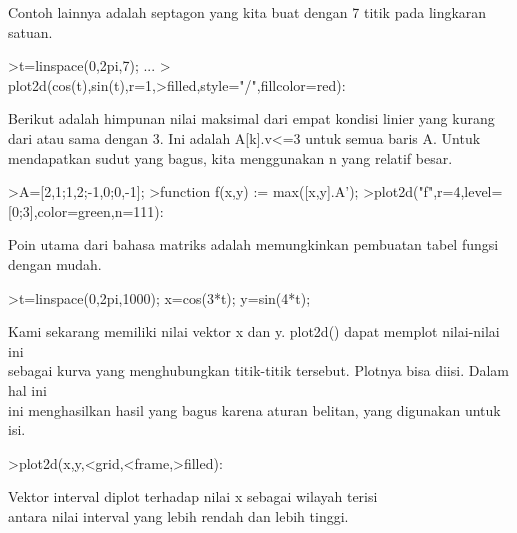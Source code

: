 \documentclass{article}
\begin{document}
\begin{eulernotebook}
\begin{eulercomment}
\begin{eulercomment}
\begin{eulercomment}
\begin{eulercomment}
\begin{eulercomment}
\begin{eulercomment}
\begin{eulercomment}
\begin{eulercomment}
\begin{eulercomment}
\begin{eulercomment}
\begin{eulercomment}
\begin{eulercomment}
\begin{eulercomment}
Contoh lainnya adalah septagon yang kita buat dengan 7 titik pada
lingkaran satuan.
\end{eulercomment}
\begin{eulerprompt}
>t=linspace(0,2pi,7);  ...
> plot2d(cos(t),sin(t),r=1,>filled,style="/",fillcolor=red):
\end{eulerprompt}
\begin{eulercomment}
Berikut adalah himpunan nilai maksimal dari empat kondisi linier yang
kurang dari atau sama dengan 3. Ini adalah A[k].v\textless{}=3 untuk semua baris
A. Untuk mendapatkan sudut yang bagus, kita menggunakan n yang relatif
besar.
\end{eulercomment}
\begin{eulerprompt}
>A=[2,1;1,2;-1,0;0,-1];
>function f(x,y) := max([x,y].A');
>plot2d("f",r=4,level=[0;3],color=green,n=111):
\end{eulerprompt}
\begin{eulercomment}
Poin utama dari bahasa matriks adalah memungkinkan pembuatan tabel
fungsi dengan mudah.
\end{eulercomment}
\begin{eulerprompt}
>t=linspace(0,2pi,1000); x=cos(3*t); y=sin(4*t);
\end{eulerprompt}
\begin{eulercomment}
Kami sekarang memiliki nilai vektor x dan y. plot2d() dapat memplot
nilai-nilai ini\\
sebagai kurva yang menghubungkan titik-titik tersebut. Plotnya bisa
diisi. Dalam hal ini\\
ini menghasilkan hasil yang bagus karena aturan belitan, yang
digunakan untuk\\
isi.
\end{eulercomment}
\begin{eulerprompt}
>plot2d(x,y,<grid,<frame,>filled):
\end{eulerprompt}
\begin{eulercomment}
Vektor interval diplot terhadap nilai x sebagai wilayah terisi\\
antara nilai interval yang lebih rendah dan lebih tinggi.


\end{eulercomment}
\end{eulercomment}
\end{eulercomment}
\end{eulercomment}
\end{eulercomment}
\end{eulercomment}
\end{eulercomment}
\end{eulercomment}
\end{eulercomment}
\end{eulercomment}
\end{eulercomment}
\end{eulercomment}
\end{eulercomment}
\end{eulernotebook}
\end{document}
